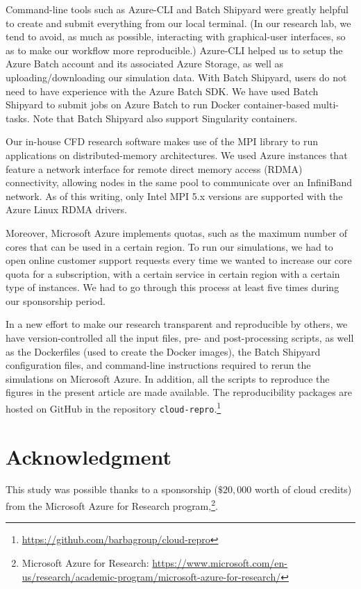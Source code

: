 \documentclass[10pt,journal,compsoc]{IEEEtran}
\begin{document}
Command-line tools such as Azure-CLI and Batch Shipyard were greatly helpful to create and submit everything from our local terminal. (In our research lab, we tend to avoid, as much as possible, interacting with graphical-user interfaces, so as to make our workflow more reproducible.)
Azure-CLI helped us to setup the Azure Batch account and its associated Azure Storage, as well as uploading/downloading our simulation data.
With Batch Shipyard, users do not need to have experience with the Azure Batch SDK.
We have used Batch Shipyard to submit jobs on Azure Batch to run Docker container-based multi-tasks.
Note that Batch Shipyard also support Singularity containers.

Our in-house CFD research software makes use of the MPI library to run applications on distributed-memory architectures.
We used Azure instances that feature a network interface for remote direct memory access (RDMA) connectivity, allowing nodes in the same pool to communicate over an InfiniBand network.
As of this writing, only Intel MPI 5.x versions are supported with the Azure Linux RDMA drivers.

Moreover, Microsoft Azure implements quotas, such as the maximum number of cores that can be used in a certain region.
To run our simulations, we had to open online customer support requests every time we wanted to increase our core quota for a subscription, with a certain service in certain region with a certain type of instances.
We had to go through this process at least five times during our sponsorship period.

In a new effort to make our research transparent and reproducible by others, we have version-controlled all the input files, pre- and post-processing scripts, as well as the Dockerfiles (used to create the Docker images), the Batch Shipyard configuration files, and command-line instructions required to rerun the simulations on Microsoft Azure.
In addition, all the scripts to reproduce the figures in the present article are made available.
The reproducibility packages are hosted on GitHub in the repository \texttt{cloud-repro}.\footnote{\url{https://github.com/barbagroup/cloud-repro}}

 \section*{Acknowledgment}

This study was possible thanks to a sponsorship ($\$20,000$ worth of cloud credits) from the Microsoft Azure for Research program,\footnote{Microsoft Azure for Research: \url{https://www.microsoft.com/en-us/research/academic-program/microsoft-azure-for-research/}}.



%
\end{document}
